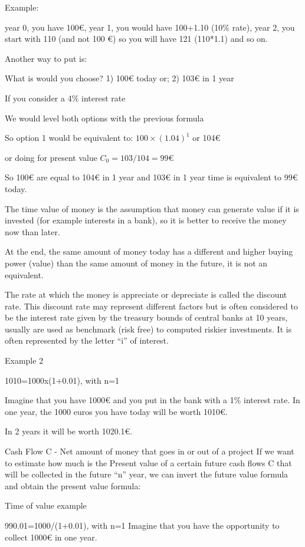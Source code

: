 \documentclass[]{book}
\newcommand{\euro}{€}
\theoremstyle{definition}
\theoremstyle{definition}
\theoremstyle{definition}
\theoremstyle{remark}
\begin{document}
Example:

year 0, you have 100\euro{}, year 1, you would have 100+1.10 (10\%
rate), year 2, you start with 110 (and not 100 \euro{}) so you will have
121 (110*1.1) and so on.

Another way to put is:

What is would you choose? 1) 100\euro{} today or; 2) 103\euro{} in 1
year

If you consider a 4\% interest rate

We would level both options with the previous formula

So option 1 would be equivalent to: \(100 \times (1.04)^1\) or
104\euro{}

or doing for present value \(C_0 =103/104 = 99€\)

So 100\euro{} are equal to 104\euro{} in 1 year and 103\euro{} in 1 year
time is equivalent to 99\euro{} today.

The time value of money is the assumption that money can generate value
if it is invested (for example interests in a bank), so it is better to
receive the money now than later.

At the end, the same amount of money today has a different and higher
buying power (value) than the same amount of money in the future, it is
not an equivalent.

The rate at which the money is appreciate or depreciate is called the
discount rate. This discount rate may represent different factors but is
often considered to be the interest rate given by the treasury bounds of
central banks at 10 years, usually are used as benchmark (risk free) to
computed riskier investments. It is often represented by the letter
``i'' of interest.

Example 2

1010=1000x(1+0.01), with n=1

Imagine that you have 1000\euro{} and you put in the bank with a 1\%
interest rate. In one year, the 1000 euros you have today will be worth
1010\euro{}.

In 2 years it will be worth 1020.1\euro{}.

Cash Flow C - Net amount of money that goes in or out of a project If we
want to estimate how much is the Present value of a certain future cash
flows C that will be collected in the future ``n'' year, we can invert
the future value formula and obtain the present value formula:

Time of value example

990.01=1000/(1+0.01), with n=1 Imagine that you have the opportunity to
collect 1000\euro{} in one year.
\end{document}
